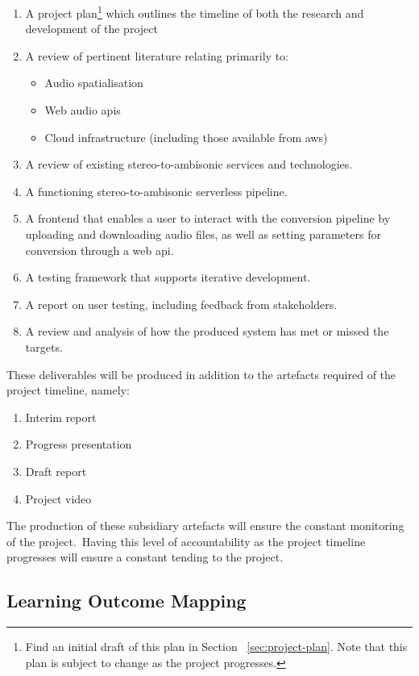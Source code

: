 \documentclass[a4paper, 12pt, british]{article}
\begin{document}
\begin{enumerate}
    \item A project plan\footnote{Find an initial draft of this plan in Section ~\ref{sec:project-plan}. Note that this plan is subject to change as the project progresses.} which outlines the timeline of both the research and development of the project
    \item A review of pertinent literature relating primarily to:
    \begin{itemize}
        \item Audio spatialisation
        \item Web audio \glspl{api}
        \item Cloud infrastructure (including those available from \gls{aws})
    \end{itemize}
    \item A review of existing stereo-to-ambisonic services and technologies.
    \item A functioning stereo-to-ambisonic serverless pipeline.
    \item A frontend that enables a user to interact with the conversion pipeline by uploading and downloading audio files, as well as setting parameters for conversion through a web \gls{api}.
    \item A testing framework that supports iterative development.
    \item A report on user testing, including feedback from stakeholders.
    \item A review and analysis of how the produced system has met or missed the targets.
\end{enumerate}

These deliverables will be produced in addition to the artefacts required of the project timeline, namely:

\begin{enumerate}
    \item Interim report
    \item Progress presentation
    \item Draft report
    \item Project video
\end{enumerate}

The production of these subsidiary artefacts will ensure the constant monitoring of the project.\ Having this level of accountability as the project timeline progresses will ensure a constant tending to the project.

\subsection{Learning Outcome Mapping}\label{subsec:learning-outcome-mapping}
\end{document}
